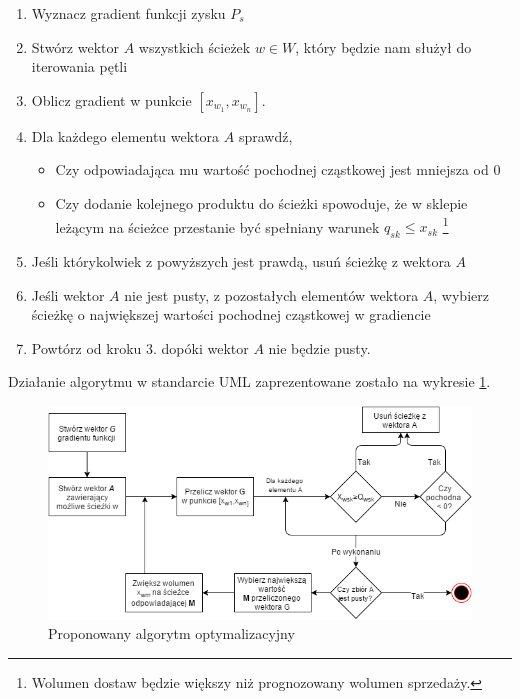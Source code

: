 \documentclass[polish, twoside, 12pt, a4paper]{article}
\theoremstyle{definition}
\theoremstyle{plain}
\theoremstyle{remark}
\begin{document}
\begin{enumerate} 
	\item Wyznacz gradient funkcji zysku $P_s$
	\item Stwórz wektor $A$ wszystkich ścieżek $w \in W$, który będzie nam służył do iterowania pętli 
	\item Oblicz gradient w punkcie $[x_{w_1}, x_{w_n}]$. 
	\item Dla każdego elementu wektora $A$ sprawdź, 
		\begin{itemize}
			\item Czy odpowiadająca mu wartość pochodnej cząstkowej jest mniejsza od 0
			\item Czy dodanie kolejnego produktu do ścieżki spowoduje, że w sklepie leżącym na ścieżce przestanie być spełniany warunek $q_{sk} \le x_{sk}$ \footnote{Wolumen dostaw będzie większy niż prognozowany wolumen sprzedaży.} 
		\end{itemize}
	\item Jeśli którykolwiek z powyższych jest prawdą, usuń ścieżkę z wektora $A$
	\item Jeśli wektor $A$ nie jest pusty, z pozostałych elementów wektora $A$, wybierz ścieżkę o największej wartości pochodnej cząstkowej w gradiencie
	\item Powtórz od kroku 3. dopóki wektor $A$ nie będzie pusty.
\end{enumerate}

Działanie algorytmu w standarcie UML zaprezentowane zostało na wykresie \ref{fig:diagramoptymalizacyny}.

\begin{figure}
  \centering
\includegraphics[width=\linewidth]{pictures/diagramoptymalizacyny.png}
  \caption{Proponowany algorytm optymalizacyjny}
  \label{fig:diagramoptymalizacyny}

\end{figure}
\end{document}

